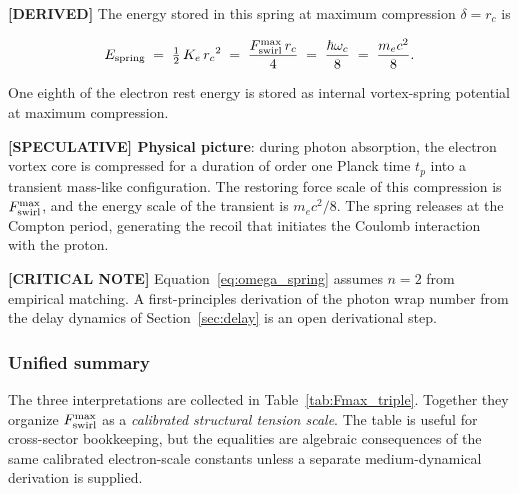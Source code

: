 \documentclass[11pt]{article}
\theoremstyle{definition}
\theoremstyle{plain}
\theoremstyle{remark}
\newcommand{\rc}{{r_c}}
\begin{document}
        \textbf{[DERIVED]} The energy stored in this spring at maximum compression $\delta = \rc$ is

        \begin{align}
            E_{\rm spring}
            \;=\; \tfrac{1}{2}\,K_e\,\rc^2
            \;=\; \frac{F_{\rm swirl}^{\max}\,\rc}{4}
            \;=\; \frac{\hbar\omega_c}{8}
            \;=\; \frac{m_e c^2}{8}.
            \label{eq:Espring}
        \end{align}

        One eighth of the electron rest energy is stored as internal vortex-spring potential at maximum compression.

        \textbf{[SPECULATIVE] Physical picture}: during photon absorption, the electron vortex core is compressed for a duration of order one Planck time $t_p$ into a transient mass-like configuration. The restoring force scale of this compression is $F_{\rm swirl}^{\max}$, and the energy scale of the transient is $m_e c^2/8$. The spring releases at the Compton period, generating the recoil that initiates the Coulomb interaction with the proton.

        \textbf{[CRITICAL NOTE]} Equation~\eqref{eq:omega_spring} assumes $n=2$ from empirical matching. A first-principles derivation of the photon wrap number from the delay dynamics of Section~\ref{sec:delay} is an open derivational step.

        \subsubsection{Unified summary}

        The three interpretations are collected in Table~\ref{tab:Fmax_triple}. Together they organize $F_{\rm swirl}^{\max}$ as a \emph{calibrated structural tension scale}. The table is useful for cross-sector bookkeeping, but the equalities are algebraic consequences of the same calibrated electron-scale constants unless a separate medium-dynamical derivation is supplied.
\end{document}
